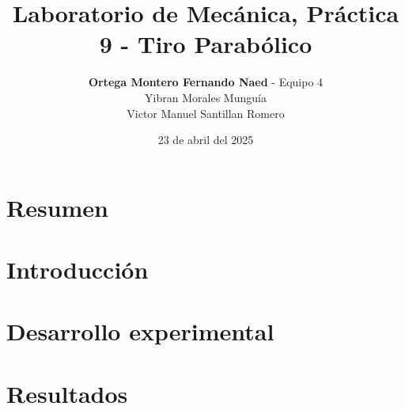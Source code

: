 \documentclass[12pt,a4paper]{article}
\begin{document}
\title{Laboratorio de Mecánica, Práctica 9 - Tiro Parabólico}
\date{23 de abril del 2025}
\author{\textbf{Ortega Montero Fernando Naed} - Equipo 4\\
Yibran Morales Munguía\\
Victor Manuel Santillan Romero}
\maketitle
\section{Resumen} 

\section{Introducción}

\section{Desarrollo experimental}

\section{Resultados}
\end{document}
